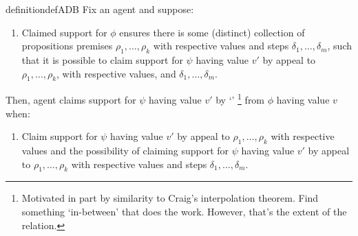 \begin{note}

    \begin{restatable}[\adB{}]{definition}{defADB}\label{AR:adB}\label{def:adB}
    Fix an agent and suppose:
    \begin{enumerate}[label=\textsf{I:\arabic*}., ref=(\textsf{I}:\arabic*), series=adB_counter]
    \item\label{def:adB:poss} Claimed support for \(\phi\) ensures there is some (distinct) collection of propositions premises \(\rho_{1},\dots,\rho_{k}\) with respective values and steps \(\delta_{1},\dots,\delta_{m}\), such that it is possible to claim support for \(\psi\) having value \(v'\) by appeal to \(\rho_{1},\dots,\rho_{k}\), with respective values, and \(\delta_{1},\dots,\delta_{m}\).
    \end{enumerate}
    Then, agent claims support for \(\psi\) having value \(v'\) by `\adB{}'\nolinebreak
    \footnote{
      Motivated in part by similarity to Craig's interpolation theorem.
      Find something `in-between' that does the work.
      However, that's the extent of the relation.
    }
    from \(\phi\) having value \(v\) when:
    \begin{enumerate}[label=\textsf{I}:\arabic*., ref=(\textsf{I}:\arabic*), resume*=adB_counter]
    \item\label{def:adB:inter} Claim support for \(\psi\) having value \(v'\) by appeal to \(\rho_{1},\dots,\rho_{k}\) with respective values and the possibility of claiming support for \(\psi\) having value \(v'\) by appeal to \(\rho_{1},\dots,\rho_{k}\) with respective values and steps \(\delta_{1},\dots,\delta_{m}\).
    \end{enumerate}
    \vspace{-\baselineskip}
  \end{restatable}
\end{note}

